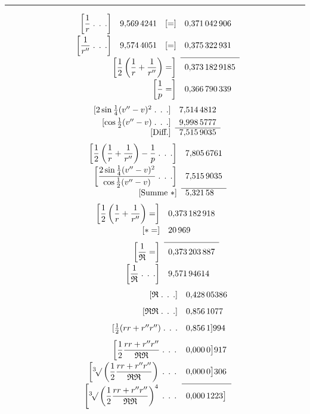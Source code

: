 \noindent\rule{\linewidth}{.3pt}
\[
\begin{array}{rlll}
{}\left[\dfrac1r\;\text{. . .}\right]&9{,}569\,4241&[=]&0{,}371\,042\,906\\[8pt]
{}\left[\dfrac1{r''}\;\text{. . .}\right]&9{,}574\,4051&[=]&0{,}375\,322\,931\\[8pt]\cline{4-4}
\multicolumn{3}{r}{\left[\dfrac12\left(\dfrac1r+\dfrac1{r''}\right)=\right]}&0{,}373\,182\,9185\\[8pt]
\multicolumn{3}{r}{\left[\dfrac1p=\right]}&0{,}366\,790\,339
\end{array}
\]
\[
\begin{array}{rl}
{}[2\sin\frac14(v''-v)^2\;\text{. . .}]&7{,}514\,4812\\[3pt]
{}[\cos\frac12(v''-v)\;\text{. . .}]&9{,}998\,5777\\\cline{2-2}
{}[\text{Diff.}]&7{,}515\,9035
\end{array}
\]
\[
\begin{array}{rl}
{}\left[\dfrac12\left(\dfrac1r+\dfrac1{r''}\right)-\dfrac1p\;\text{. . .}\right]&7{,}805\,6761\\[8pt]
{}\left[\dfrac{2\sin\frac14(v''-v)^2}{\cos\frac12(v''-v)}\;\text{. . .}\right]&7{,}515\,9035\\[8pt]\cline{2-2}
{}[\text{Summe }\ast]&5{,}321\,58
\end{array}
\]
\[
\begin{array}{rl}
{}\left[\dfrac12\left(\dfrac1r+\dfrac1{r''}\right)=\right]&0{,}373\,182\,918\\[8pt]
{}[\ast=]&20\,969\\[8pt]\cline{2-2}
{}\left[\dfrac1{\mathfrak R}=\right]&0{,}373\,203\,887\\[8pt]
{}\left[\dfrac1{\mathfrak R}\;\text{. . .}\right]&9{,}571\,94614
\end{array}
\]
\[
\begin{array}{rl}
{}[\mathfrak R\;\text{. . .}]&0{,}428\,05386\\[8pt]
{}[\mathfrak R\mathfrak R\;\text{. . .}]&0{,}856\,1077\\[8pt]
{}[\frac12(rr+r''r'')\;\text{. . .}&0{,}856\,1]994\\[8pt]
{}\left[\dfrac12\dfrac{rr+r''r''}{\mathfrak R\mathfrak R}\;\text{. . .}\right.&0{,}000\,0\big]917\\[8pt]
{}\left[\mathord{{}^{3}\!\surd}\left(\dfrac12\dfrac{rr+r''r''}{\mathfrak R\mathfrak R}\right)\;\text{. . .}\right.&0{,}000\,0\big]306\\[8pt]\cline{2-2}
{}\left[\mathord{{}^{3}\!\surd}\left(\dfrac12\dfrac{rr+r''r''}{\mathfrak R\mathfrak R}\right)^4\;\text{. . .}\right.&0{,}000\,1223\big]
\end{array}
\]
